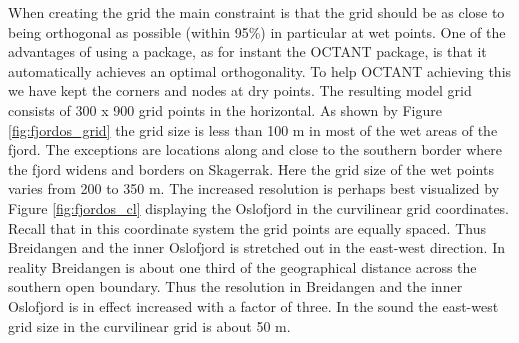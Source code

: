 When creating the grid the main constraint is that the grid should be as close to being orthogonal as possible (within 95\%) in particular at wet points. One of the advantages of using a package, as for instant the OCTANT package, is that it automatically achieves an optimal orthogonality. To help OCTANT achieving this we have kept the corners and nodes at dry points. The resulting model grid consists of 300 x 900 grid points in the horizontal. As shown by Figure \ref{fig:fjordos_grid} the grid size is less than 100 m in most of the wet areas of the fjord. The exceptions are locations along and close to the southern border where the fjord widens and borders on Skagerrak. Here the grid size of the wet points varies from 200 to 350 m. The increased resolution is perhaps best visualized by Figure \ref{fig:fjordos_cl} displaying the Oslofjord in the curvilinear grid coordinates. Recall that in this coordinate system the grid points are equally spaced. Thus Breidangen and the inner Oslofjord is stretched out in the east-west direction. In reality Breidangen is about one third of the geographical distance across the southern open boundary. Thus the resolution in Breidangen and the inner Oslofjord is in effect increased with a factor of three. In the {\DR} sound the east-west grid size in the curvilinear grid is about 50 m.  


